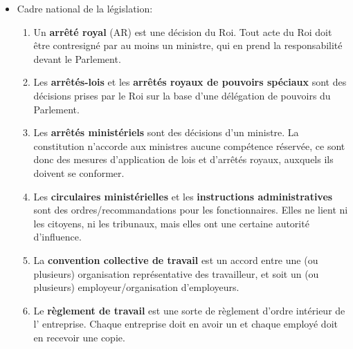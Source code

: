 \documentclass[a4paper]{article}
\begin{document}
\begin{itemize}
\item Cadre national de la législation:
\begin{enumerate}
    \item Un \textbf{arrêté royal} (AR) est une décision du Roi. Tout acte du Roi doit être contresigné par au moins un ministre, qui en prend la responsabilité devant le Parlement.
    \item Les \textbf{arrêtés-lois} et les \textbf{arrêtés royaux de pouvoirs spéciaux} sont des décisions prises par le Roi sur la base d’une délégation de pouvoirs du Parlement.
    \item Les \textbf{arrêtés ministériels} sont des décisions d’un ministre. La constitution n’accorde aux ministres aucune compétence réservée, ce sont donc des mesures d’application de lois et d’arrêtés royaux, auxquels ils doivent se conformer.
    \item Les \textbf{circulaires ministérielles} et les \textbf{instructions administratives} sont des ordres/recommandations pour les fonctionnaires. Elles ne lient ni les citoyens, ni les tribunaux, mais elles ont une certaine autorité d’influence.    
    \item La \textbf{convention collective de travail} est un accord entre une (ou plusieurs) organisation représentative des travailleur, et soit un (ou plusieurs) employeur/organisation d’employeurs.
    \item Le \textbf{règlement de travail} est une sorte de règlement d’ordre intérieur de l’ entreprise. Chaque entreprise doit en avoir un et chaque employé doit en recevoir une copie.
\end{enumerate}






\end{itemize}
\end{document}
